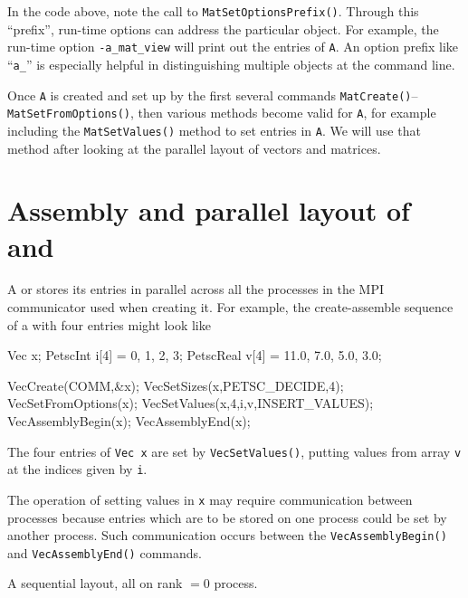 In the \pMat code above, note the call to \texttt{MatSetOptionsPrefix()}.  Through this ``prefix'', run-time options can address the particular \pMat object.  For example, the run-time option \texttt{-a\_mat\_view} will print out the entries of \texttt{A}.  An option prefix like ``\texttt{a\_}'' is especially helpful in distinguishing multiple \pMat objects at the command line.

Once \pMat \texttt{A} is created and set up by the first several commands \texttt{MatCreate()}--\texttt{MatSetFromOptions()}, then various methods become valid for \texttt{A}, for example including the \texttt{MatSetValues()} method to set entries in \texttt{A}.  We will use that method after looking at the parallel layout of vectors and matrices.


\section{Assembly and parallel layout of \pVecs and \pMats}

A \pVec or \pMat stores its entries in parallel across all the processes in the MPI communicator used when creating it.  For example, the create-assemble sequence of a \pVec with four entries might look like
\begin{code}
Vec x;
PetscInt   i[4] = {0, 1, 2, 3};
PetscReal  v[4] = {11.0, 7.0, 5.0, 3.0};

VecCreate(COMM,&x);
VecSetSizes(x,PETSC_DECIDE,4);
VecSetFromOptions(x);
VecSetValues(x,4,i,v,INSERT_VALUES);
VecAssemblyBegin(x);
VecAssemblyEnd(x);
\end{code}
The four entries of \texttt{Vec x} are set by \texttt{VecSetValues()}, putting values from array \texttt{v} at the indices given by \texttt{i}.

The operation of setting values in \texttt{x} may require communication between processes because entries which are to be stored on one process could be set by another process.  Such communication occurs between the \texttt{VecAssemblyBegin()} and \texttt{VecAssemblyEnd()} commands.

\begin{marginfigure}
\bigskip
\caption{A sequential \pVec layout, all on rank $=0$ process.}
\label{fig:seqveclayout}
\end{marginfigure}

